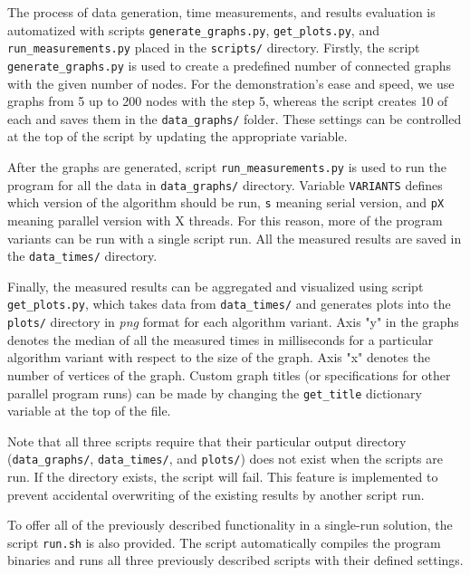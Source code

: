 \documentclass[11pt,a4paper]{article}
\begin{document}
The process of data generation, time measurements, and results evaluation is automatized with scripts \texttt{generate\_graphs.py}, \texttt{get\_plots.py}, and \texttt{run\_measurements.py} placed in the \texttt{scripts/} directory. Firstly, the script \texttt{generate\_graphs.py} is used to create a predefined number of connected graphs with the given number of nodes. For the demonstration's ease and speed, we use graphs from 5 up to 200 nodes with the step 5, whereas the script creates 10 of each and saves them in the \texttt{data\_graphs/} folder. These settings can be controlled at the top of the script by updating the appropriate variable.

After the graphs are generated, script \texttt{run\_measurements.py} is used to run the program for all the data in \texttt{data\_graphs/} directory. Variable \texttt{VARIANTS} defines which version of the algorithm should be run, \texttt{s} meaning serial version, and \texttt{pX} meaning parallel version with X threads. For this reason, more of the program variants can be run with a single script run. All the measured results are saved in the \texttt{data\_times/} directory.

Finally, the measured results can be aggregated and visualized using script \texttt{get\_plots.py}, which takes data from \texttt{data\_times/} and generates plots into the \texttt{plots/} directory in \textit{png} format for each algorithm variant. Axis "y" in the graphs denotes the median of all the measured times in milliseconds for a particular algorithm variant with respect to the size of the graph. Axis "x" denotes the number of vertices of the graph. Custom graph titles (or specifications for other parallel program runs) can be made by changing the \texttt{get\_title} dictionary variable at the top of the file.

Note that all three scripts require that their particular output directory (\texttt{data\_graphs/}, \texttt{data\_times/}, and \texttt{plots/}) does not exist when the scripts are run. If the directory exists, the script will fail. This feature is implemented to prevent accidental overwriting of the existing results by another script run.

To offer all of the previously described functionality in a single-run solution, the script \texttt{run.sh} is also provided. The script automatically compiles the program binaries and runs all three previously described scripts with their defined settings.

\end{document}
